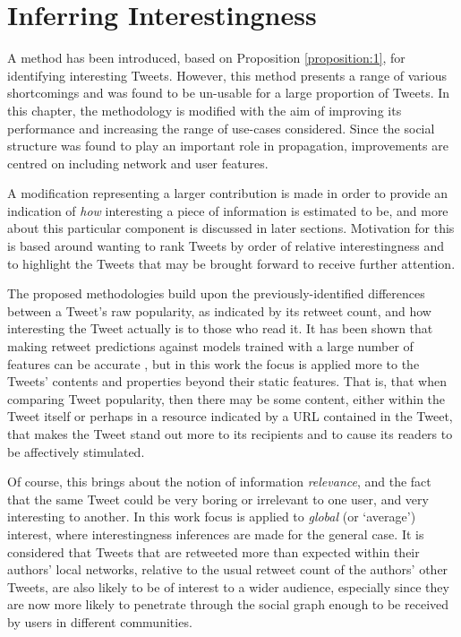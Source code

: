 \chapter{Inferring Interestingness}

A method has been introduced, based on Proposition \ref{proposition:1}, for identifying interesting Tweets. However, this method presents a range of various shortcomings and was found to be un-usable for a large proportion of Tweets. In this chapter, the methodology is modified with the aim of improving its performance and increasing the range of use-cases considered. Since the social structure was found to play an important role in propagation, improvements are centred on including network and user features.

A modification representing a larger contribution is made in order to provide an indication of \textit{how} interesting a piece of information is estimated to be, and more about this particular component is discussed in later sections. Motivation for this is based around wanting to rank Tweets by order of relative interestingness and to highlight the Tweets that may be brought forward to receive further attention.

The proposed methodologies build upon the previously-identified differences between a Tweet's raw popularity, as indicated by its retweet count, and how interesting the Tweet actually is to those who read it. It has been shown that making retweet predictions against models trained with a large number of features can be accurate \cite{zhu11}, but in this work the focus is applied more to the Tweets' contents and properties beyond their static features. That is, that when comparing Tweet popularity, then there may be some content, either within the Tweet itself or perhaps in a resource indicated by a URL contained in the Tweet, that makes the Tweet stand out more to its recipients and to cause its readers to be affectively stimulated.

Of course, this brings about the notion of information \textit{relevance}, and the fact that the same Tweet could be very boring or irrelevant to one user, and very interesting to another. In this work focus is applied to \textit{global} (or `average') interest, where interestingness inferences are made for the general case. It is considered that Tweets that are retweeted more than expected within their authors' local networks, relative to the usual retweet count of the authors' other Tweets, are also likely to be of interest to a wider audience, especially since they are now more likely to penetrate through the social graph enough to be received by users in different communities.
 
